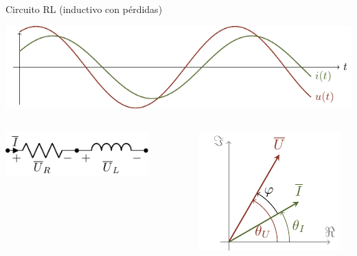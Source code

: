 \documentclass[aspectratio=169, usenames,svgnames,dvipsnames]{beamer}
\begin{document}
\begin{frame}[label={sec:org2fdfb7c}]{Circuito RL (inductivo con pérdidas)}
\begin{center}
\includegraphics[height=0.25\textheight]{../figs/inductivo.pdf}
\end{center}
\begin{columns}
\begin{column}{0.45\columnwidth}
\begin{center}
\includegraphics[width=0.8\textwidth]{../figs/RL.pdf}
\end{center}
\end{column}


\begin{column}{0.55\columnwidth}
\begin{center}
\includegraphics[height=0.5\textheight]{../figs/fasorInductanciaReal_VI.pdf}
\end{center}
\end{column}
\end{columns}
\end{frame}
\end{document}
